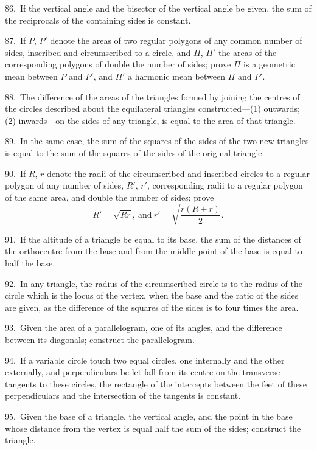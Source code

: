 \documentclass[oneside]{book}
\begin{document}
\begin{footnotesize}
86.~If the vertical angle and the bisector of the vertical angle
be given, the sum of the reciprocals of the containing sides is
constant.

87.~If $P$, $P'$ denote the areas of two regular polygons of any
common number of sides, inscribed and circumscribed to a circle,
and $\Pi$, $\Pi'$ the areas of the corresponding polygons of double the
number of sides; prove $\Pi$ is a geometric mean between $P$ and $P'$,
and $\Pi'$ a harmonic mean between
$\Pi$ and $P'$.

88.~The difference of the areas of the triangles formed by joining
the centres of the circles described about the equilateral triangles
constructed---(1) outwards; (2) inwards---on the sides of
any triangle, is equal to the area of that triangle.

89.~In the same case, the sum of the squares of the sides of
the two new triangles is equal to the sum of the squares of the
sides of the original triangle.

90.~If $R$, $r$ denote the radii of the circumscribed and inscribed
circles to a regular polygon of any number of sides, $R'$, $r'$, corresponding
radii to a regular polygon of the same area, and double
the number of sides; prove
\[
R' = \sqrt{Rr},\ \text{and}\ r' = \sqrt{\frac{r(R+r)}{2}}.
\]

91.~If the altitude of a triangle be equal to its base, the sum
of the distances of the orthocentre from the base and from the
middle point of the base is equal to half the base.

92.~In any triangle, the radius of the circumscribed circle is to
the radius of the circle which is the locus of the vertex, when
the base and the ratio of the sides are given, as the difference of
the squares of the sides is to four times the area.

93.~Given the area of a parallelogram, one of its angles, and
the difference between its diagonals; construct the parallelogram.

94.~If a variable circle touch two equal circles, one internally
and the other externally, and perpendiculars be let fall from its
centre on the transverse tangents to these circles, the rectangle of
the intercepts between the feet of these perpendiculars and the
intersection of the tangents is constant.

95.~Given the base of a triangle, the vertical angle, and the
point in the base whose distance from the vertex is equal half
the sum of the sides; construct the triangle.


\end{footnotesize}
\end{document}
